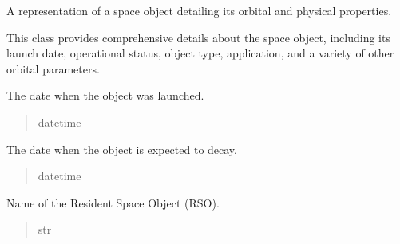 \documentclass[letterpaper,10pt,english]{sphinxmanual}
\begin{document}
\begin{fulllineitems}
\sphinxAtStartPar
A representation of a space object detailing its orbital and physical properties.

\sphinxAtStartPar
This class provides comprehensive details about the space object, including its launch date,
operational status, object type, application, and a variety of other orbital parameters.

\begin{fulllineitems}
\label{\detokenize{fspsim.utils:fspsim.utils.SpaceObject.SpaceObject.launch_date}}
\pysigstartsignatures
{}
\pysigstopsignatures
\sphinxAtStartPar
The date when the object was launched.
\begin{quote}\begin{description}
\sphinxAtStartPar
datetime

\end{description}\end{quote}

\end{fulllineitems}


\begin{fulllineitems}
\label{\detokenize{fspsim.utils:fspsim.utils.SpaceObject.SpaceObject.decay_date}}
\pysigstartsignatures
{}
\pysigstopsignatures
\sphinxAtStartPar
The date when the object is expected to decay.
\begin{quote}\begin{description}
\sphinxAtStartPar
datetime

\end{description}\end{quote}

\end{fulllineitems}


\begin{fulllineitems}
\label{\detokenize{fspsim.utils:fspsim.utils.SpaceObject.SpaceObject.rso_name}}
\pysigstartsignatures
{}
\pysigstopsignatures
\sphinxAtStartPar
Name of the Resident Space Object (RSO).
\begin{quote}\begin{description}
\sphinxAtStartPar
str


\end{description}
\end{quote}
\end{fulllineitems}
\end{fulllineitems}
\end{document}
